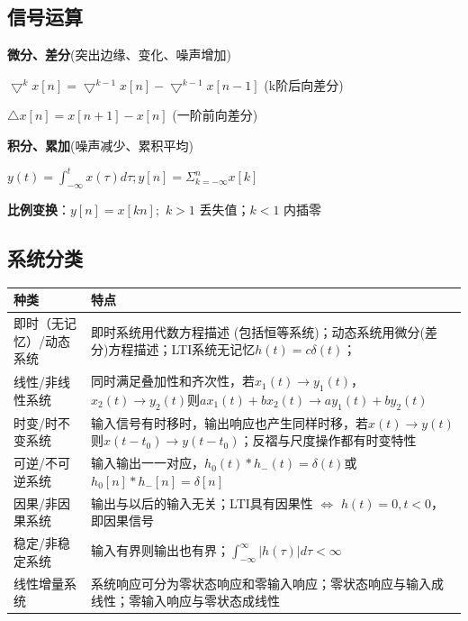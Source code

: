 \subsection*{信号运算}

\textbf{微分、差分}(突出边缘、变化、噪声增加)
   
   $\bigtriangledown ^k x[n] = \bigtriangledown ^{k-1} x[n] - \bigtriangledown ^{k-1} x[n-1]$ (k阶后向差分)
   
   $\bigtriangleup x[n] = x[n+1] - x[n]$ (一阶前向差分)

\textbf{积分、累加}(噪声减少、累积平均)
   
   $y(t) = \int ^{t} _{-\infty} x(\tau) d\tau; y[n] = \Sigma ^{n} _{k=- \infty} x[k]$

\textbf{比例变换}：$y[n]=x[kn];$ $k>1$ 丢失值；$k<1$ 内插零

\subsection*{系统分类}

\begin{center}
\begin{tabularx}{\columnwidth}{|p{25pt}|X|}
\hline
种类 & 特点 \\
\hline
即时（无记忆）/动态系统 & 即时系统用代数方程描述 (包括恒等系统)；动态系统用微分(差分)方程描述；LTI系统无记忆$h(t)=c\delta(t)$； \\
\hline
线性/非线性系统 & 同时满足叠加性和齐次性，若$x_1(t)\rightarrow y_1(t)$，$x_2(t)\rightarrow y_2(t)$则$ax_1(t)+bx_2(t)\rightarrow ay_1(t)+by_2(t)$ \\
\hline
时变/时不变系统 & 输入信号有时移时，输出响应也产生同样时移，若$x(t)\rightarrow y(t)$则$x(t-t_0)\rightarrow y(t-t_0)$；反褶与尺度操作都有时变特性 \\
\hline
可逆/不可逆系统 & 输入输出一一对应，$h_0(t)*h_-(t)=\delta(t) $或 $h_0[n]*h_-[n]=\delta[n]$ \\
\hline
因果/非因果系统 & 输出与以后的输入无关；LTI具有因果性 $\Leftrightarrow$ $h(t)=0, t<0$，即因果信号 \\
\hline
稳定/非稳定系统 & 输入有界则输出也有界；$\int^\infty_{-\infty}|h(\tau)|d\tau<\infty$ \\
\hline
线性增量系统 & 系统响应可分为零状态响应和零输入响应；零状态响应与输入成线性；零输入响应与零状态成线性 \\
\hline
\end{tabularx}
\end{center}

